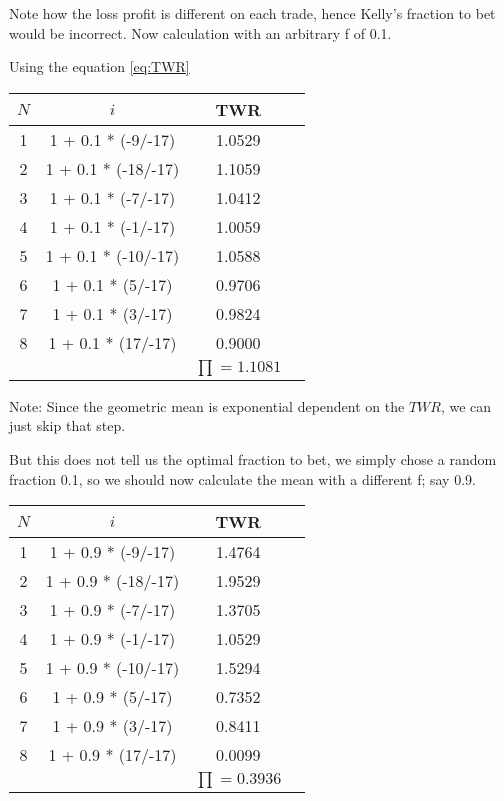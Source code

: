 \documentclass[12pt]{article}
\begin{document}
    Note how the loss profit is different on each trade, hence Kelly's fraction to bet would be 
    incorrect. Now calculation with an arbitrary f of 0.1.

    Using the equation \ref{eq:TWR}

    \begin{center}
    \begin{tabular}{ |c|c|c|c| } 
     \hline
        \(N\) & \(i\) & TWR \\
        \hline
        1 & 1 + 0.1 * (-9/-17)  & 1.0529 \\
        2 & 1 + 0.1 * (-18/-17) & 1.1059 \\
        3 & 1 + 0.1 * (-7/-17)  & 1.0412 \\
        4 & 1 + 0.1 * (-1/-17)  & 1.0059 \\
        5 & 1 + 0.1 * (-10/-17) & 1.0588 \\
        6 & 1 + 0.1 * (5/-17)   & 0.9706 \\
        7 & 1 + 0.1 * (3/-17)   & 0.9824 \\
        8 & 1 + 0.1 * (17/-17)  & 0.9000 \\
        \hline
        & & \(\prod = 1.1081\)\\
     \hline
    \end{tabular}
    \end{center}

    Note: Since the geometric mean is exponential dependent on the \(TWR\), we can just skip that
    step.

    But this does not tell us the optimal fraction to bet, we simply chose a random fraction 
    0.1, so we should now calculate the mean with a different f; say 0.9.

    \begin{center}
    \begin{tabular}{ |c|c|c|c| } 
     \hline
        \(N\) & \(i\) & TWR \\
        \hline
        1 & 1 + 0.9 * (-9/-17)  & 1.4764 \\
        2 & 1 + 0.9 * (-18/-17) & 1.9529 \\
        3 & 1 + 0.9 * (-7/-17)  & 1.3705 \\
        4 & 1 + 0.9 * (-1/-17)  & 1.0529 \\
        5 & 1 + 0.9 * (-10/-17) & 1.5294 \\
        6 & 1 + 0.9 * (5/-17)   & 0.7352 \\
        7 & 1 + 0.9 * (3/-17)   & 0.8411 \\
        8 & 1 + 0.9 * (17/-17)  & 0.0099 \\
        \hline
        & & \(\prod = 0.3936\)\\
     \hline
    \end{tabular}
    \end{center}
\end{document}
